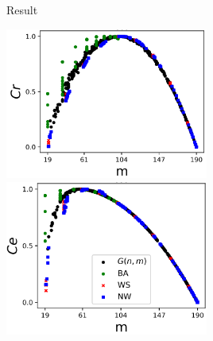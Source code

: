 \documentclass{beamer}
\begin{document}
\begin{frame}{Result}
\begin{multicols}{3}
        \end{multicols}
        \begin{multicols}{2}
            \centering
            \includegraphics[width=0.5\textwidth,height=0.3\textheight,keepaspectratio]{7.png}
            \includegraphics[width=0.5\textwidth,height=0.3\textheight,keepaspectratio]{8.png}
        \end{multicols}
    \end{frame}
\end{document}
